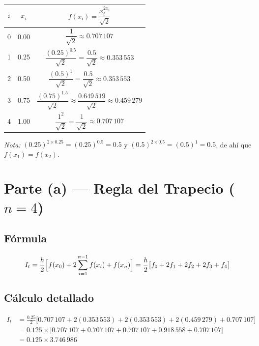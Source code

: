 \documentclass[12pt,a4paper]{article}
\begin{document}
\begin{center}
\renewcommand{\arraystretch}{1.35}
\begin{tabular}{ccc}
\toprule
$i$ & $x_i$ & $f(x_i) = \dfrac{x_i^{2x_i}}{\sqrt{2}}$ \\[4pt]
\midrule
0 & 0.00 & $\dfrac{1}{\sqrt{2}} \approx 0.707\,107$ \\[6pt]
1 & 0.25 & $\dfrac{(0.25)^{0.5}}{\sqrt{2}} = \dfrac{0.5}{\sqrt{2}} \approx 0.353\,553$ \\[6pt]
2 & 0.50 & $\dfrac{(0.5)^{1}}{\sqrt{2}} = \dfrac{0.5}{\sqrt{2}} \approx 0.353\,553$ \\[6pt]
3 & 0.75 & $\dfrac{(0.75)^{1.5}}{\sqrt{2}} \approx \dfrac{0.649\,519}{\sqrt{2}} \approx 0.459\,279$ \\[6pt]
4 & 1.00 & $\dfrac{1^2}{\sqrt{2}} = \dfrac{1}{\sqrt{2}} \approx 0.707\,107$ \\[4pt]
\bottomrule
\end{tabular}
\end{center}

\textit{Nota:} $(0.25)^{2\times0.25} = (0.25)^{0.5} = 0.5$ y
$(0.5)^{2\times0.5} = (0.5)^1 = 0.5$, de ah\'i que $f(x_1)=f(x_2)$.

\section*{Parte (a) --- Regla del Trapecio ($n=4$)}

\subsection*{F\'ormula}

\[
  I_t = \frac{h}{2}\Bigl[f(x_0) + 2\sum_{i=1}^{n-1}f(x_i) + f(x_n)\Bigr]
      = \frac{h}{2}\bigl[f_0 + 2f_1 + 2f_2 + 2f_3 + f_4\bigr]
\]

\subsection*{C\'alculo detallado}

\begin{align*}
  I_t &= \frac{0.25}{2}\bigl[0.707\,107
         + 2(0.353\,553)
         + 2(0.353\,553)
         + 2(0.459\,279)
         + 0.707\,107\bigr] \\[4pt]
      &= 0.125 \times \bigl[0.707\,107
         + 0.707\,107
         + 0.707\,107
         + 0.918\,558
         + 0.707\,107\bigr] \\[4pt]
      &= 0.125 \times 3.746\,986
\end{align*}
\end{document}
